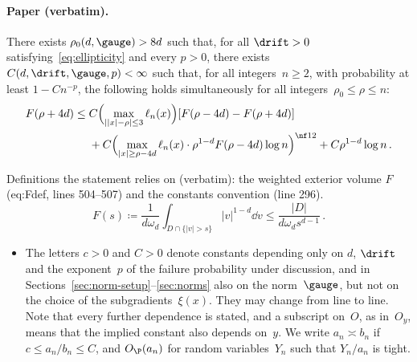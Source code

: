 \paragraph{Paper (verbatim).}
\begin{lemma}\label{lem:radial}
There exists $\rho_0(d,\gauge)>8d$ such that, for all $\drift>0$ satisfying~\eqref{eq:ellipticity} and every $p>0$, there exists $C(d,\drift,\gauge,p)<\infty$ such that, for all integers~$n\geq2$, with probability at least $1-Cn^{-p}$, the following holds simultaneously for all integers~$\rho_0\leq\rho\leq n$:
\begin{equation}\label{eq:radial}
\begin{split}
F(\rho+4d)\leq{}&C\Bigl(\max_{||x|-\rho|\leq3}\ell_n(x)\Bigr)
[F(\rho-4d)-F(\rho+4d)]\\
&+C\Bigl(\max_{|x|\geq\rho-4d}\ell_n(x)\cdot\rho^{1-d}F(\rho-4d)\log n\Bigr)^{\nf12}+C\rho^{1-d}\log n\, .
\end{split}
\end{equation}
\end{lemma}
Definitions the statement relies on (verbatim): the weighted exterior volume $F$ (eq:Fdef, lines 504--507) and the
constants convention (line 296).
\begin{equation}\label{eq:Fdef}
F(s)\coloneqq\frac1{d\omega_d}\int_{D\cap\{|v|>s\}}|v|^{1-d}\dd v
\leq\frac{|D|}{d\omega_ds^{d-1}}\, .
\end{equation}
\begin{itemize}
\item The letters $c>0$ and $C>0$ denote constants depending only on $d$, $\drift$ and the exponent~$p$ of the failure probability under discussion, and in Sections~\ref{sec:norm-setup}--\ref{sec:norms} also on the norm~$\gauge$, but not on the choice of the subgradients~$\xi(x)$. They may change from line to line. Note that every further dependence is stated, and a subscript on~$O$, as in~$O_y$, means that the implied constant also depends on~$y$. We write $a_n\asymp b_n$ if $c\leq a_n/b_n\leq C$, and $O_{\P}(a_n)$ for random variables~$Y_n$ such that $Y_n/a_n$ is tight.
\end{itemize}
